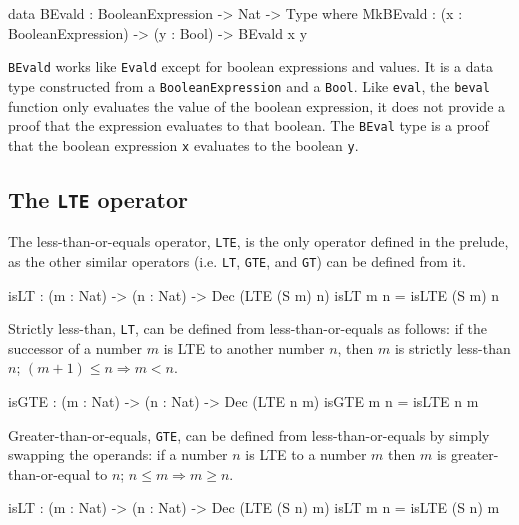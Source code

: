         \begin{code}[caption={\texttt{BEvald} as defined in the \Idris model}]
data BEvald : BooleanExpression -> Nat -> Type where
    MkBEvald : (x : BooleanExpression) -> (y : Bool) -> BEvald x y
        \end{code}
        \texttt{BEvald} works like \texttt{Evald} except for boolean expressions and values. It is a data type constructed from a \texttt{BooleanExpression} and a \texttt{Bool}. Like \texttt{eval}, the \texttt{beval} function only evaluates the value of the boolean expression, it does not provide a proof that the expression evaluates to that boolean. The \texttt{BEval} type is a proof that the boolean expression \texttt{x} evaluates to the boolean \texttt{y}.
        
    \subsection{The \texttt{LTE} operator}\label{des:tp:lte}
        The less-than-or-equals operator, \texttt{LTE}, is the only operator defined in the \Idris prelude, as the other similar operators (i.e. \texttt{LT}, \texttt{GTE}, and \texttt{GT}) can be defined from it.
        
        \begin{code}[caption={\texttt{LT} can be defined based on \texttt{LTE}}]
        isLT : (m : Nat) -> (n : Nat) -> Dec (LTE (S m) n)
        isLT m n = isLTE (S m) n
        \end{code}
        
        Strictly less-than, \texttt{LT}, can be defined from less-than-or-equals as follows: if the successor of a number $m$ is LTE to another number $n$, then $m$ is strictly less-than $n$; $(m + 1) \leq n \Rightarrow m < n$.
        
        \begin{code}[caption={\texttt{GTE} can be defined based on \texttt{LTE}}]
        isGTE : (m : Nat) -> (n : Nat) -> Dec (LTE n m)
        isGTE m n = isLTE n m
        \end{code}
        
        Greater-than-or-equals, \texttt{GTE}, can be defined from less-than-or-equals by simply swapping the operands: if a number $n$ is LTE to a number $m$ then $m$ is greater-than-or-equal to $n$; $n \leq m \Rightarrow m \geq n$.
        
        \begin{code}[caption={\texttt{GT} can be defined based on \texttt{LTE}}]
        isLT : (m : Nat) -> (n : Nat) -> Dec (LTE (S n) m)
        isLT m n = isLTE (S n) m
        \end{code}
        
